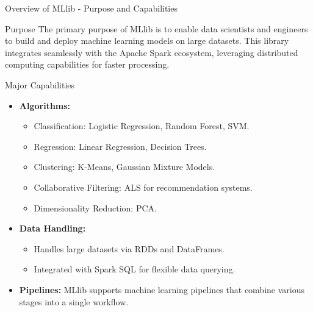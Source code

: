 \documentclass[aspectratio=169]{beamer}
\begin{document}
\begin{frame}[fragile]{Overview of MLlib - Purpose and Capabilities}
    \begin{block}{Purpose}
        The primary purpose of MLlib is to enable data scientists and engineers to build and deploy machine learning models on large datasets. 
        This library integrates seamlessly with the Apache Spark ecosystem, leveraging distributed computing capabilities for faster processing.
    \end{block}

    \begin{block}{Major Capabilities}
        \begin{itemize}
            \item \textbf{Algorithms:} 
            \begin{itemize}
                \item Classification: Logistic Regression, Random Forest, SVM.
                \item Regression: Linear Regression, Decision Trees.
                \item Clustering: K-Means, Gaussian Mixture Models.
                \item Collaborative Filtering: ALS for recommendation systems.
                \item Dimensionality Reduction: PCA.
            \end{itemize}
            \item \textbf{Data Handling:} 
            \begin{itemize}
                \item Handles large datasets via RDDs and DataFrames.
                \item Integrated with Spark SQL for flexible data querying.
            \end{itemize}
            \item \textbf{Pipelines:} 
            MLlib supports machine learning pipelines that combine various stages into a single workflow.
        \end{itemize}
    \end{block}
\end{frame}
\end{document}
